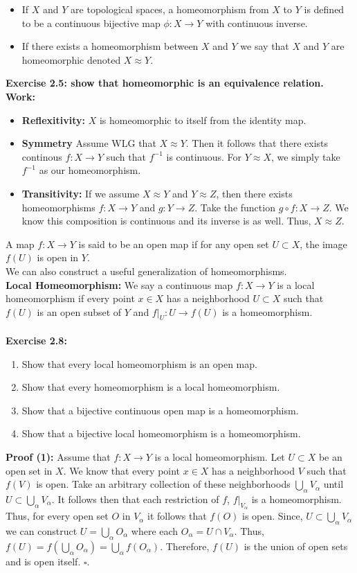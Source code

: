 \documentclass{article}
\begin{document}
\begin{itemize}
    \item If $X$ and $Y$ are topological spaces, a homeomorphism from $X$ to $Y$ is defined to be a continuous bijective map $\phi:X\to Y$ with continuous inverse.
    \item If there exists a homeomorphism between $X$ and $Y$ we say that $X$ and $Y$ are homeomorphic denoted $X\approx Y$.
\end{itemize}
\textbf{Exercise 2.5: show that homeomorphic is an equivalence relation.}\\
\textbf{Work:}
\begin{itemize}
    \item \textbf{Reflexitivity:} $X$ is homeomorphic to itself from the identity map.
    \item \textbf{Symmetry} Assume WLG that $X\approx Y$. Then it follows that there exists continous $f:X\to Y$ such that $f^{-1}$ is continuous. For $Y\approx X$, we simply take $f^{-1}$ as our homeomorphism.
    \item \textbf{Transitivity:} If we assume $X\approx Y$ and $Y\approx Z$, then there exists homeomorphisms $f:X\to Y$ and $g:Y\to Z$. Take the function $g\circ f:X\to Z$. We know this composition is continuous and its inverse is as well. Thus, $X\approx Z$.
\end{itemize}
A map $f:X\to Y$ is said to be an open map if for any open set $U\subset X$, the image $f(U)$ is open in $Y$.\\
We can also construct a useful generalization of homeomorphisms.\\
\textbf{Local Homeomorphism:} We say a continuous map $f:X\to Y$ is a local homeomorphism if every point $x\in X$ has a neighborhood $U\subset X$ such that $f(U)$ is an open subset of $Y$ and $f|_U:U\to f(U)$ is a homeomorphism.\\
\\
\textbf{Exercise 2.8: }
\begin{enumerate}
    \item Show that every local homeomorphism is an open map.
    \item  Show that every homeomorphism is a local homeomorphism.
    \item Show that a bijective continuous open map is a homeomorphism.
    \item Show that a bijective local homeomorphism is a homeomorphism.
\end{enumerate}
\textbf{Proof (1):} Assume that $f:X\to Y$ is a local homeomorphism. Let $U\subset X$ be an open set in $X$. We know that every point $x\in X$ has a neighborhood $V$ such that $f(V)$ is open. Take an arbitrary collection of these neighborhoods $\bigcup\limits_\alpha V_\alpha$ until $U\subset \bigcup\limits_\alpha V_\alpha$. It follows then that each restriction of $f$, $f|_{V_\alpha}$ is a homeomorphism. Thus, for every open set $O$ in $V_\alpha$ it follows that $f(O)$ is open. Since, $U\subset \bigcup\limits_{\alpha} V_\alpha$ we can construct $U=\bigcup\limits_{\alpha}O_\alpha$ where each $O_\alpha=U\cap V_\alpha$. Thus, $f(U)=f(\bigcup\limits_\alpha O_\alpha)=\bigcup\limits_\alpha f(O_\alpha)$. Therefore, $f(U)$ is the union of open sets and is open itself. $\square$.\\
\end{document}
